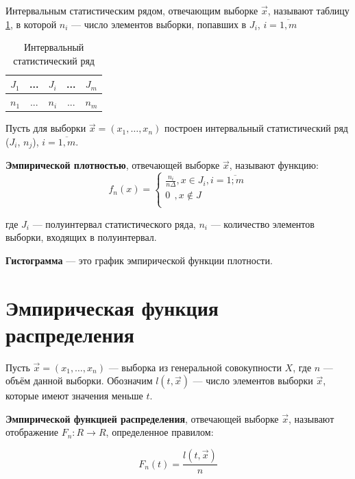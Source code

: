 Интервальным статистическим рядом, отвечающим выборке $\vec{x}$, называют таблицу \ref{table:row1}, в которой $n_i$ --- число элементов выборки, попавших в $J_i$, $i=\overline{1,m}$

\begin{table}[ht!]
	\captionsetup{singlelinecheck = false, justification=centering}
	\caption{Интервальный статистический ряд}
	\centering
	\label{table:row1}
	\begin{tabular}{|c|c|c|c|c|}
		\hline
		$J_1$ & ... & $J_i$ & ... & $J_m$ \\
		\hline
		$n_1$ & ... & $n_i$ & ... & $n_m$ \\
		\hline
	\end{tabular}
\end{table}

Пусть для выборки $\vec{x} = (x_1, \dots, x_n)$ построен интервальный статистический ряд ($J_i$, $n_j$), $i=\overline{1,m}$.

\textbf{Эмпирической плотностью}, отвечающей выборке $\vec x$, называют функцию:
\begin{equation}
	f_n(x) =
	\begin{cases}
		\frac{n_i}{n \Delta}, x \in J_i, i = \overline{1; m} \\
		0\ \ , x \not\in J \\
	\end{cases}
\end{equation}

где $J_i$ --- полуинтервал статистического ряда, 
$n_i$ --- количество элементов выборки, входящих в полуинтервал.

\textbf{Гистограмма} --- это график эмпирической функции плотности. 


\section{Эмпирическая функция распределения}

Пусть $\vec{x} = (x_1, \dots, x_n)$ --- выборка из генеральной совокупности $X$, где $n$ --- объём данной выборки.
Обозначим $l(t, \vec x)$ --- число элементов выборки $\vec x$, которые имеют значения меньше $t$.

\textbf{Эмпирической функцией распределения}, отвечающей выборке $\vec x$, называют отображение $F_n: R \to R$, определенное правилом: 

\begin{equation}
	F_n(t) = \frac{l(t, \vec x)}{n}
\end{equation}


